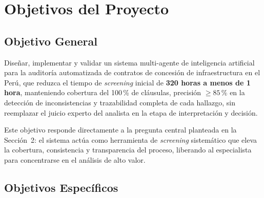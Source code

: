 \chapter{Objetivos del Proyecto}

\section{Objetivo General}

Diseñar, implementar y validar un sistema multi-agente de inteligencia artificial
para la auditoría automatizada de contratos de concesión de infraestructura en el
Perú, que reduzca el tiempo de \textit{screening} inicial de \textbf{320 horas a
menos de 1 hora}, manteniendo cobertura del 100\,\% de cláusulas, precisión
$\geq 85\,\text{\%}$ en la detección de inconsistencias y trazabilidad completa de
cada hallazgo, sin reemplazar el juicio experto del analista en la etapa de
interpretación y decisión.

Este objetivo responde directamente a la pregunta central planteada en la
Sección~2: el sistema actúa como herramienta de \textit{screening} sistemático
que eleva la cobertura, consistencia y transparencia del proceso, liberando al
especialista para concentrarse en el análisis de alto valor.

\section{Objetivos Específicos}

